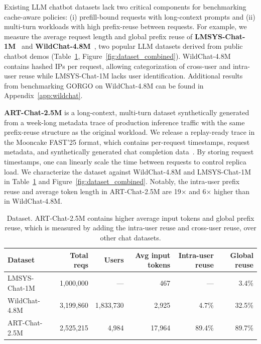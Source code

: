 \documentclass{article}
\begin{document}
Existing LLM chatbot datasets lack two critical components for benchmarking
cache-aware policies: (i) prefill-bound requests with long-context prompts and
(ii) multi-turn workloads with high prefix-reuse between requests. For example,
we measure the average request length and global prefix reuse of
\textbf{LMSYS-Chat-1M}~\citep{lmsys2024} and \textbf{WildChat-4.8M}~\citep{wildchat2024},
two popular LLM datasets derived from public chatbot demos
(Table~\ref{tab:datasets}, Figure~\ref{fig:dataset_combined}). WildChat-4.8M
contains hashed IPs per request, allowing categorization of cross-user and
intra-user reuse while LMSYS-Chat-1M lacks user identification. Additional
results from benchmarking GORGO on WildChat-4.8M can be found in
Appendix~\ref{app:wildchat}.

\textbf{ART-Chat-2.5M} is a long-context, multi-turn dataset synthetically generated from
a week-long metadata trace of production inference traffic with the same
prefix-reuse structure as the original workload. We release a replay-ready trace
in the Mooncake FAST'25 format, which contains per-request timestamps, request
metadata, and synthetically generated chat completion data~\citep{qin2024mooncake}.
By storing request timestamps, one can linearly scale the time between requests
to control replica load. We characterize the dataset against WildChat-4.8M and
LMSYS-Chat-1M in Table~\ref{tab:datasets} and Figure~\ref{fig:dataset_combined}.
Notably, the intra-user prefix reuse and average token length in ART-Chat-2.5M
are 19$\times$ and 6$\times$ higher than in WildChat-4.8M.

\begin{table}[t]
\centering
\small
\caption{Dataset. ART-Chat-2.5M contains higher average input tokens and global prefix reuse, which is measured by
adding the intra-user reuse and cross-user reuse, over other chat datasets.
}
\label{tab:datasets}
\begin{tabular}{lrrrrr}
\toprule
Dataset & Total reqs & Users & Avg input tokens & Intra-user reuse & Global reuse \\
\midrule
LMSYS-Chat-1M & 1{,}000{,}000 & --- & 467 & --- & 3.4\% \\
WildChat-4.8M & 3{,}199{,}860 & 1{,}833{,}730 & 2{,}925 & 4.7\% & 32.5\% \\
ART-Chat-2.5M & 2{,}525{,}215 & 4{,}984 & 17{,}964 & 89.4\% & 89.7\% \\
\bottomrule
\end{tabular}
\end{table}
\end{document}
